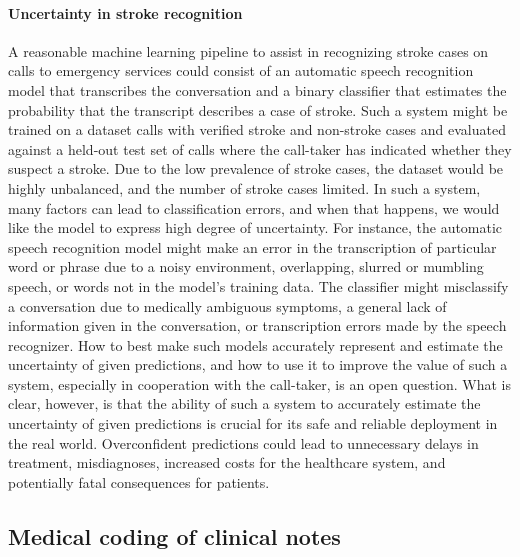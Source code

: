 \paragraph{Uncertainty in stroke recognition} A reasonable machine learning pipeline to assist in recognizing stroke cases on calls to emergency services could consist of an automatic speech recognition model that transcribes the conversation and a binary classifier that estimates the probability that the transcript describes a case of stroke. 
Such a system might be trained on a dataset calls with verified stroke and non-stroke cases and evaluated against a held-out test set of calls where the call-taker has indicated whether they suspect a stroke. Due to the low prevalence of stroke cases, the dataset would be highly unbalanced, and the number of stroke cases limited. 
In such a system, many factors can lead to classification errors, and when that happens, we would like the model to express high degree of uncertainty. 
For instance, the automatic speech recognition model might make an error in the transcription of particular word or phrase due to a noisy environment, overlapping, slurred or mumbling speech, or words not in the model's training data. 
The classifier might misclassify a conversation due to medically ambiguous symptoms, a general lack of information given in the conversation, or transcription errors made by the speech recognizer. 
How to best make such models accurately represent and estimate the uncertainty of given predictions, and how to use it to improve the value of such a system, especially in cooperation with the call-taker, is an open question.
What is clear, however, is that the ability of such a system to accurately estimate the uncertainty of given predictions is crucial for its safe and reliable deployment in the real world. Overconfident predictions could lead to unnecessary delays in treatment, misdiagnoses, increased costs for the healthcare system, and potentially fatal consequences for patients.


\subsection{Medical coding of clinical notes} \label{subsec:motivation-medical-coding}
%
